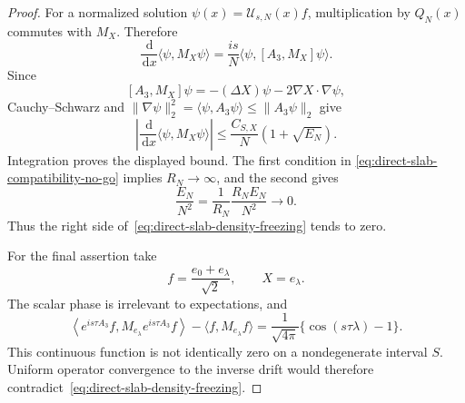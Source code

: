 \documentclass[11pt]{article}
\theoremstyle{remark}
\newcommand{\dd}{\,\mathrm d}
\begin{document}
\begin{proof}
For a normalized solution $\psi(x)=\mathcal U_{s,N}(x)f$, multiplication by
$Q_N(x)$ commutes with $M_X$.  Therefore
\[
 \frac{\dd}{\dd x}\langle\psi,M_X\psi\rangle
 =
 \frac{is}{N}\langle\psi,[A_3,M_X]\psi\rangle .
\]
Since
\[
 [A_3,M_X]\psi
 =
 -(\Delta X)\psi-2\nabla X\cdot\nabla\psi,
\]
Cauchy--Schwarz and
$\|\nabla\psi\|_2^2=\langle\psi,A_3\psi\rangle
\leq\|A_3\psi\|_2$ give
\[
 \left|
 \frac{\dd}{\dd x}\langle\psi,M_X\psi\rangle
 \right|
 \leq
 \frac{C_{S,X}}{N}
 \left(1+\sqrt{E_N}\right).
\]
Integration proves the displayed bound.  The first condition in
\eqref{eq:direct-slab-compatibility-no-go} implies $R_N\to\infty$, and the
second gives
\[
 \frac{E_N}{N^2}
 =
 \frac1{R_N}\frac{R_NE_N}{N^2}\longrightarrow0.
\]
Thus the right side of~\eqref{eq:direct-slab-density-freezing} tends to zero.

For the final assertion take
\[
 f=\frac{e_0+e_\lambda}{\sqrt2},
 \qquad X=e_\lambda.
\]
The scalar phase is irrelevant to expectations, and
\[
 \left\langle
 e^{is\tau A_3}f,M_{e_\lambda}e^{is\tau A_3}f
 \right\rangle
 -
 \langle f,M_{e_\lambda}f\rangle
 =
 \frac1{\sqrt{4\pi}}
 \{\cos(s\tau\lambda)-1\}.
\]
This continuous function is not identically zero on a nondegenerate
interval $S$.  Uniform operator convergence to the inverse drift would
therefore contradict~\eqref{eq:direct-slab-density-freezing}.
\end{proof}
\end{document}

